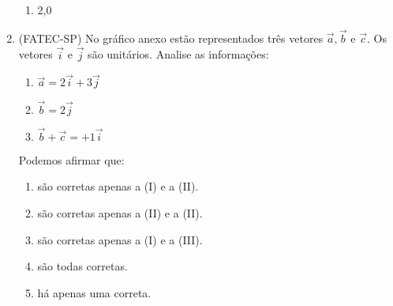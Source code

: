 \begin{enumerate}
\begin{enumerate}
\item {} 
2,0

\end{enumerate}

\item (FATEC-SP) No gráfico anexo estão representados três vetores \(\vec{a},\vec{b}\)  e  \(\vec{c}\). Os vetores \(\vec{i}\) e \(\vec{j}\) são unitários. Analise as informações:
\begin{enumerate}
\item {} 
\(\vec{a}=2\vec{i}+3\vec{j}\)

\item {} 
\(\vec{b}=2\vec{j}\)

\item {} 
\(\vec{b}+\vec{c}=+1\vec{i}\)

\end{enumerate}
\begin{quote}
\begin{center}\end{center}\end{quote}

Podemos afirmar que:
\begin{enumerate}
\item {} 
são corretas apenas a (I) e a (II).

\item {} 
são corretas apenas a (II) e a (II).

\item {} 
são corretas apenas a (I) e a (III).

\item {} 
são todas corretas.

\item {} 
há apenas uma correta.

\end{enumerate}
\end{enumerate}

